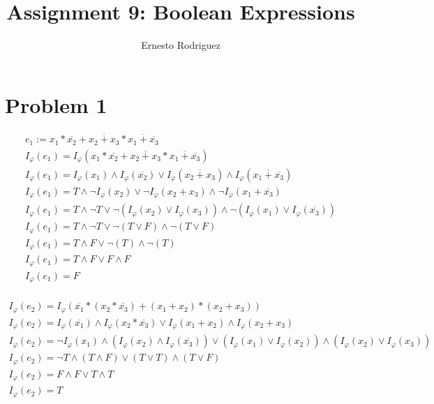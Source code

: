 \documentclass[11pt]{article}
\author{Ernesto Rodriguez}
\title{Assignment 9: Boolean Expressions}
\begin{document}
\maketitle

\section{Problem 1}
\[
\begin{array}{ll}
  e_1 := x_1 * \overline{x_2} + \overline{x_2 + x_3} * \overline{x_1 + \overline{x_3}} \\
  I_{\varphi}(e_1)=I_{\varphi}(x_1 * \overline{x_2} + \overline{x_2 + x_3} * \overline{x_1 + \overline{x_3}})\\
  I_{\varphi}(e_1)=I_{\varphi}(x_1) \wedge I_{\varphi}( \overline{x_2}) \vee I_{\varphi}(\overline{x_2 + x_3}) \wedge I_{\varphi}(\overline{x_1 + \overline{x_3}})\\
  I_{\varphi}(e_1)=T \wedge \neg I_{\varphi}(x_2) \vee \neg I_{\varphi}(x_2 + x_3) \wedge \neg I_{\varphi}(x_1 + \overline{x_3})\\
  I_{\varphi}(e_1)=T \wedge \neg T \vee \neg (I_{\varphi}(x_2) \vee I_{\varphi}(x_3)) \wedge \neg (I_{\varphi}(x_1) \vee I_{\varphi}(\overline{x_3}))\\
  I_{\varphi}(e_1)=T \wedge \neg T \vee \neg (T \vee F) \wedge \neg (T \vee F)\\
  I_{\varphi}(e_1)=T \wedge F \vee \neg (T) \wedge \neg (T)\\
  I_{\varphi}(e_1)=T \wedge F \vee F \wedge F\\
  I_{\varphi}(e_1)=F\\
\end{array}
\]

\[
\begin{array}{ll}
  I_{\varphi}(e_2)=I_{\varphi}(\overline{x_1} * (x_2*\overline{x_3}) + (x_1 + x_2) * (x_2+x_3))\\
  I_{\varphi}(e_2)=I_{\varphi}(\overline{x_1}) \wedge I_{\varphi}(x_2*\overline{x_3}) \vee  I_{\varphi}(x_1 + x_2) \wedge I_{\varphi}(x_2+x_3)\\
  I_{\varphi}(e_2)=\neg I_{\varphi}(x_1) \wedge ( I_{\varphi}(x_2) \wedge I_{\varphi}(\overline{x_3})) \vee  (I_{\varphi}(x_1) \vee I_{\varphi}(x_2)) \wedge (I_{\varphi}(x_2) \vee I_{\varphi}(x_3))\\
  I_{\varphi}(e_2)=\neg T \wedge ( T \wedge F) \vee  (T \vee T) \wedge (T \vee F)\\
  I_{\varphi}(e_2)=F \wedge F \vee  T \wedge T\\
  I_{\varphi}(e_2)=T\\
\end{array}
\]
  
\end{document}
